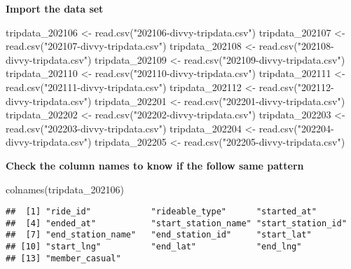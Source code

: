 \documentclass[
]{article}
\newenvironment{Shaded}{\begin{snugshade}}{\end{snugshade}}
\newcommand{\FunctionTok}[1]{\textcolor[rgb]{0.00,0.00,0.00}{#1}}
\newcommand{\NormalTok}[1]{#1}
\newcommand{\OtherTok}[1]{\textcolor[rgb]{0.56,0.35,0.01}{#1}}
\newcommand{\StringTok}[1]{\textcolor[rgb]{0.31,0.60,0.02}{#1}}
\begin{document}
\textbf{Import the data set}

\begin{Shaded}
\begin{Highlighting}[]
\NormalTok{tripdata\_202106 }\OtherTok{\textless{}{-}} \FunctionTok{read.csv}\NormalTok{(}\StringTok{"202106{-}divvy{-}tripdata.csv"}\NormalTok{)}
\NormalTok{tripdata\_202107 }\OtherTok{\textless{}{-}} \FunctionTok{read.csv}\NormalTok{(}\StringTok{"202107{-}divvy{-}tripdata.csv"}\NormalTok{)}
\NormalTok{tripdata\_202108 }\OtherTok{\textless{}{-}} \FunctionTok{read.csv}\NormalTok{(}\StringTok{"202108{-}divvy{-}tripdata.csv"}\NormalTok{)}
\NormalTok{tripdata\_202109 }\OtherTok{\textless{}{-}} \FunctionTok{read.csv}\NormalTok{(}\StringTok{"202109{-}divvy{-}tripdata.csv"}\NormalTok{)}
\NormalTok{tripdata\_202110 }\OtherTok{\textless{}{-}} \FunctionTok{read.csv}\NormalTok{(}\StringTok{"202110{-}divvy{-}tripdata.csv"}\NormalTok{)}
\NormalTok{tripdata\_202111 }\OtherTok{\textless{}{-}} \FunctionTok{read.csv}\NormalTok{(}\StringTok{"202111{-}divvy{-}tripdata.csv"}\NormalTok{)}
\NormalTok{tripdata\_202112 }\OtherTok{\textless{}{-}} \FunctionTok{read.csv}\NormalTok{(}\StringTok{"202112{-}divvy{-}tripdata.csv"}\NormalTok{)}
\NormalTok{tripdata\_202201 }\OtherTok{\textless{}{-}} \FunctionTok{read.csv}\NormalTok{(}\StringTok{"202201{-}divvy{-}tripdata.csv"}\NormalTok{)}
\NormalTok{tripdata\_202202 }\OtherTok{\textless{}{-}} \FunctionTok{read.csv}\NormalTok{(}\StringTok{"202202{-}divvy{-}tripdata.csv"}\NormalTok{)}
\NormalTok{tripdata\_202203 }\OtherTok{\textless{}{-}} \FunctionTok{read.csv}\NormalTok{(}\StringTok{"202203{-}divvy{-}tripdata.csv"}\NormalTok{)}
\NormalTok{tripdata\_202204 }\OtherTok{\textless{}{-}} \FunctionTok{read.csv}\NormalTok{(}\StringTok{"202204{-}divvy{-}tripdata.csv"}\NormalTok{)}
\NormalTok{tripdata\_202205 }\OtherTok{\textless{}{-}} \FunctionTok{read.csv}\NormalTok{(}\StringTok{"202205{-}divvy{-}tripdata.csv"}\NormalTok{)}
\end{Highlighting}
\end{Shaded}

\textbf{Check the column names to know if the follow same pattern}

\begin{Shaded}
\begin{Highlighting}[]
\FunctionTok{colnames}\NormalTok{(tripdata\_202106)}
\end{Highlighting}
\end{Shaded}

\begin{verbatim}
##  [1] "ride_id"            "rideable_type"      "started_at"        
##  [4] "ended_at"           "start_station_name" "start_station_id"  
##  [7] "end_station_name"   "end_station_id"     "start_lat"         
## [10] "start_lng"          "end_lat"            "end_lng"           
## [13] "member_casual"
\end{verbatim}
\end{document}
